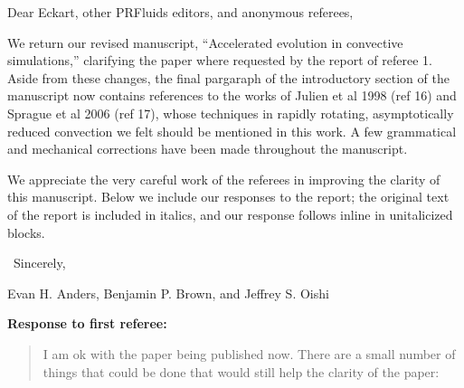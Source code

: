 \documentclass[aps, 11pt, singlecolumn]{revtex4-1} %
\begin{document}
\newenvironment{myquotation}{
\begin{quotation}
\itshape
}{ 
\end{quotation}
}
\noindent
Dear Eckart, other PRFluids editors, and anonymous referees,
$\,$\newline

\begin{singlespace}
We return our revised manuscript, ``Accelerated evolution in convective simulations,''
clarifying the paper where requested by the report of referee 1. 
Aside from these changes, the 
final pargaraph of the introductory section of the 
manuscript now contains references to the works of
Julien et al 1998 (ref 16) and Sprague et al 2006 (ref 17), whose techniques in
rapidly rotating, asymptotically reduced convection 
we felt should be mentioned in this work. A few grammatical and mechanical
corrections have been made throughout the manuscript.

We appreciate the very careful work of the referees in improving the clarity of
this manuscript. Below we include our responses to the report; the original
text of the report is included in italics, and our response follows inline in
unitalicized blocks.

$\,$\newline
\noindent
Sincerely,

Evan H. Anders, Benjamin P. Brown, and Jeffrey S. Oishi




\newpage
\noindent
\Large{\textbf{Response to first referee:}}\newline$\,$\newline\indent

\begin{myquotation}
I am ok with the paper being published now.   There are a small number of things
that could be done that would still help the clarity of the paper:


\end{myquotation}
\end{singlespace}
\end{document}
